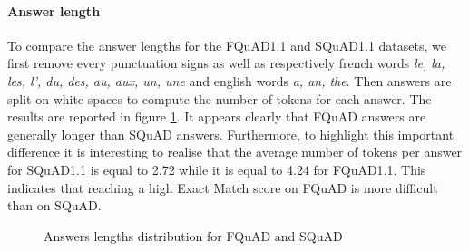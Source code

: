 \documentclass{article}
\begin{document}
\paragraph{Answer length}{
To compare the answer lengths for the FQuAD1.1 and SQuAD1.1 datasets, we first remove every punctuation signs as well as respectively french words \textit{le, la, les, l', du, des, au, aux, un, une} and english words \textit{a, an, the}.
Then answers are split on white spaces to compute the number of tokens for each answer.
The results are reported in figure \ref{fig:answer_length_fquad_squad}.
It appears clearly that FQuAD answers are generally longer than SQuAD answers. 
Furthermore, to highlight this important difference it is interesting to realise that the average number of tokens per answer for SQuAD1.1 is equal to 2.72 while it is equal to 4.24 for FQuAD1.1.
This indicates that reaching a high Exact Match score on FQuAD is more difficult than on SQuAD.
}


\begin{figure}[ht!]
    \centering
    \caption{Answers lengths distribution for FQuAD and SQuAD}
    \label{fig:answer_length_fquad_squad}
\end{figure}
 
\end{document}

